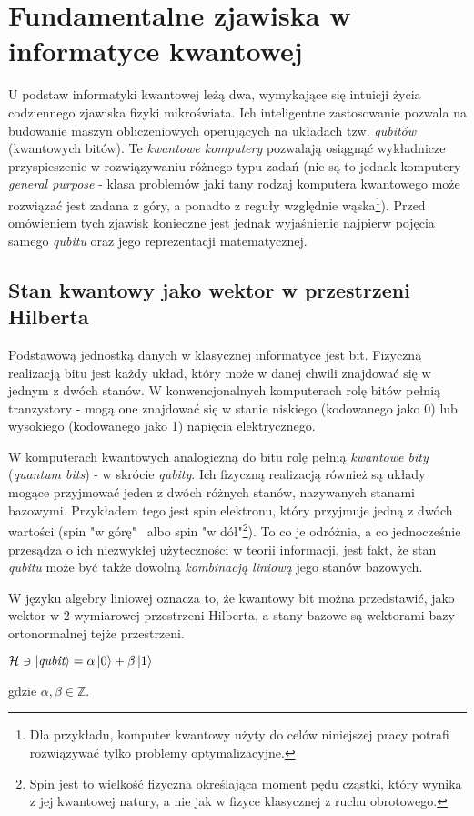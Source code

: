 \documentclass[12pt,a4paper,twoside,openany]{book}
\begin{document}
\section{Fundamentalne zjawiska w informatyce kwantowej}

U podstaw informatyki kwantowej leżą dwa, wymykające się intuicji życia codziennego zjawiska fizyki mikroświata. Ich inteligentne zastosowanie pozwala na budowanie maszyn obliczeniowych operujących na układach tzw. \textit{qubitów} (kwantowych bitów). Te \textit{kwantowe komputery} pozwalają osiągnąć wykładnicze przyspieszenie w rozwiązywaniu różnego typu zadań (nie są to jednak komputery \textit{general purpose} - klasa problemów jaki tany rodzaj komputera kwantowego może rozwiązać jest zadana z góry, a ponadto z reguły względnie wąska\footnote{Dla przykładu, komputer kwantowy użyty do celów niniejszej pracy potrafi rozwiązywać tylko problemy optymalizacyjne.}).
Przed omówieniem tych zjawisk konieczne jest jednak wyjaśnienie najpierw pojęcia samego \textit{qubitu} oraz jego reprezentacji matematycznej.

\subsection{Stan kwantowy jako wektor w przestrzeni Hilberta}

Podstawową jednostką danych w klasycznej informatyce jest bit. Fizyczną realizacją bitu jest każdy układ, który może w danej chwili znajdować się w jednym z dwóch stanów. W konwencjonalnych komputerach rolę bitów pełnią tranzystory - mogą one znajdować się w stanie niskiego (kodowanego jako 0) lub wysokiego (kodowanego jako 1) napięcia elektrycznego.

W komputerach kwantowych analogiczną do bitu rolę pełnią \textit{kwantowe bity} (\textit{quantum bits}) - w skrócie \textit{qubity}. Ich fizyczną realizacją również są układy mogące przyjmować jeden z dwóch różnych stanów, nazywanych stanami bazowymi. Przykładem tego jest spin elektronu, który przyjmuje jedną z dwóch wartości (spin "w górę" ~albo spin "w dół"\footnote{Spin jest to wielkość fizyczna określająca moment pędu cząstki, który wynika z jej kwantowej natury, a nie jak w fizyce klasycznej z ruchu obrotowego.}). To co je odróżnia, a co jednocześnie przesądza o ich niezwykłej użyteczności w teorii informacji, jest fakt, że stan \textit{qubitu} może być także dowolną \textit{kombinacją liniową} jego stanów bazowych.

W języku algebry liniowej oznacza to, że kwantowy bit można przedstawić, jako wektor w 2-wymiarowej przestrzeni Hilberta, a stany bazowe są wektorami bazy ortonormalnej tejże przestrzeni.
\begin{center}
    $\mathcal{H} \ni \ket{\textit{qubit}} = \alpha\ket{0} + \beta\ket{1}$
\end{center}
gdzie $\alpha, \beta \in \mathbb{Z}$.
\end{document}
